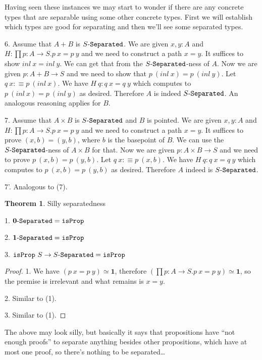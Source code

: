 \documentclass[11pt]{article}
\theoremstyle{definition}
\newtheorem{theorem}{Theorem}[section]
\newcommand{\text}[1]{\texttt{#1}}
\renewcommand{\(}{\left(}
\renewcommand{\)}{\right)}
\newcommand{\defn}{:\equiv}
\newcommand{\isProp}{\text{isProp}}
\newcommand{\apl}[2]{#1\ #2}
\newcommand{\hequiv}[2]{#1 \simeq #2}
\newcommand{\Empty}{\mathbf{0}}
\newcommand{\Unit}{\mathbf{1}}
\newcommand{\dprod}[2]{\prod #1.#2}
\newcommand{\prodt}[2]{#1 \times #2}
\newcommand{\sumt}[2]{#1 + #2}
\begin{document}
Having seen these instances we may start to wonder if there are any concrete types that are separable using some other concrete types. First we will establish which types are good for separating and then we'll see some separated types.

6. Assume that $\sumt{A}{B}$ is $\Separated{S}$. We are given $x, y : A$ and $H : \dprod{p : A \to S}{\apl{p}{x} = \apl{p}{y}}$ and we need to construct a path $x = y$. It suffices to show $\apl{inl}{x} = \apl{inl}{y}$. We can get that from the $\Separated{S}$-ness of $A$. Now we are given $p : \sumt{A}{B} \to S$ and we need to show that $\apl{p}{(\apl{inl}{x})} = \apl{p}{(\apl{inl}{y})}$. Let $\apl{q}{x} \defn \apl{p}{(\apl{inl}{x})}$. We have $\apl{H}{q} : \apl{q}{x} = \apl{q}{y}$ which computes to $\apl{p}{(\apl{inl}{x})} = \apl{p}{(\apl{inl}{y})}$ as desired. Therefore $A$ is indeed $\Separated{S}$. An analogous reasoning applies for $B$.

7. Assume that $\prodt{A}{B}$ is $\Separated{S}$ and $B$ is pointed. We are given $x, y : A$ and $H : \dprod{p : A \to S}{\apl{p}{x} = \apl{p}{y}}$ and we need to construct a path $x = y$. It suffices to prove $(x, b) = (y, b)$, where $b$ is the basepoint of $B$. We can use the $\Separated{S}$-ness of $\prodt{A}{B}$ for that. Now we are given $p : \prodt{A}{B} \to S$ and we need to prove $\apl{p}{(x, b)} = \apl{p}{(y, b)}$. Let $\apl{q}{x} \defn \apl{p}{(x, b)}$. We have $\apl{H}{q} : \apl{q}{x} = \apl{q}{y}$ which computes to $\apl{p}{(x, b)} = \apl{p}{(y, b)}$ as desired. Therefore $A$ indeed is $\Separated{S}$.

7'. Analogous to (7).

\begin{theorem} Silly separatedness

1. $\Separated{\Empty} = \isProp$

2. $\Separated{\Unit} = \isProp$

3. $\apl{\isProp}{S} \to \Separated{S} = \isProp$

\end{theorem}
\begin{proof}
1. We have $\hequiv{(\apl{p}{x} = \apl{p}{y})}{\Unit}$, therefore $\hequiv{(\dprod{p : A \to S}{\apl{p}{x} = \apl{p}{y}})}{\Unit}$, so the premise is irrelevant and what remains is $x = y$.

2. Similar to (1).

3. Similar to (1).
\end{proof}

The above may look silly, but basically it says that propositions have ``not enough proofs'' to separate anything besides other propositions, which have at most one proof, so there's nothing to be separated\dots
\end{document}
